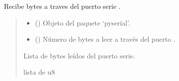 \documentclass[letterpaper,10pt,english]{sphinxmanual}
\begin{document}
\begin{fulllineitems}
\label{\detokenize{fpga.interfaz_pcps:fpga.interfaz_pcps.receive_bytestr}}
\pysigstartsignatures
{}
\pysigstopsignatures
\sphinxAtStartPar
Recibe  bytes a traves del puerto serie .
\begin{quote}\begin{description}
\begin{itemize}
\item {} 
\sphinxAtStartPar
{} () \textendash{} Objeto  del paquete ‘pyserial’.

\item {} 
\sphinxAtStartPar
{} () \textendash{} Número de bytes a leer a través del puerto .

\end{itemize}

\sphinxAtStartPar
Lista de bytes leídos del puerto serie.

\sphinxAtStartPar
lista de u8

\end{description}\end{quote}

\end{fulllineitems}

\end{document}
